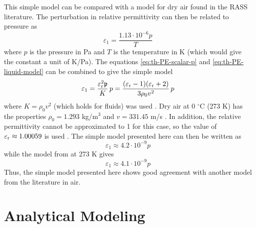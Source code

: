 \documentclass[11pt,twoside]{eitExjobb}
\begin{document}
	This simple model can be compared with a model for dry air found in the RASS literature. The perturbation in relative permittivity can then be related to pressure as \cite{Rapoport1997}
	\begin{equation*}
		\varepsilon_1 = \frac{1.13 \cdot 10^{-6} p}{T}
	\end{equation*}
	where $p$ is the pressure in Pa and $T$ is the temperature in K (which would give the constant a unit of K/Pa). The equations \eqref{eq:th-PE-scalar-p} and \eqref{eq:th-PE-liquid-model} can be combined to give the simple model
	\begin{equation*}
		\varepsilon_1 = \frac{\varepsilon_{\mathrm{r}}^2 \mathfrak{p}}{K} \,p = \frac{(\varepsilon_{\mathrm{r}} - 1)(\varepsilon_{\mathrm{r}} + 2)}{3\rho_0 v^2} \,p
	\end{equation*}
	where $K = \rho_0 v^2$ (which holds for fluids) was used \cite{Schmerr2016}. Dry air at 0 $^\circ$C (273 K) has the properties $\rho_0 = 1.293$ kg/m$^3$ and $v = 331.45$ m/s \cite{Onda2003}. In addition, the relative permittivity cannot be approximated to 1 for this case, so the value of $\varepsilon_{\mathrm{r}} \approx 1.00059$ is used \cite{Hector1936}. The simple model presented here can then be written as
	\begin{equation*}
		\varepsilon_1 \approx 4.2 \cdot 10^{-9} p
	\end{equation*}
	while the model from \cite{Rapoport1997} at 273 K gives
	\begin{equation*}
		\varepsilon_1 \approx 4.1 \cdot 10^{-9} p
	\end{equation*}
	Thus, the simple model presented here shows good agreement with another model from the literature in air.
	
	\chapter{Analytical Modeling \label{ch:analytical}}
	
\end{document}
